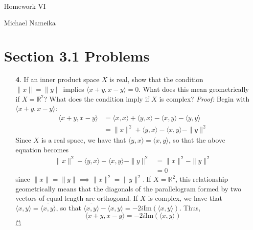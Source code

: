 \documentclass{article}
\begin{document}
\begin{center}
    {\Huge Homework VI}
    \vspace{0.5cm}

    {\Large Michael Nameika}
\end{center}

\section*{Section 3.1 Problems}
\begin{itemize}
    \item[\textbf{4}.] If an inner product space $X$ is real, show that the condition $\|x\| = \|y\|$ implies $\langle x + y, x - y \rangle = 0$. What does this mean geometrically if $X = \mathbb{R}^2$? What does the condition imply if $X$ is complex?
    \newline\newline
    \textit{Proof:} Begin with $\langle x + y, x - y \rangle$:
    \begin{align*}
        \langle x + y, x - y \rangle &= \langle x, x \rangle + \langle y, x \rangle - \langle x,y \rangle - \langle y,y \rangle\\
        &= \|x\|^2 + \langle y, x\rangle - \langle x,y \rangle - \|y\|^2
    \end{align*}
    Since $X$ is a real space, we have that $\langle y,x \rangle = \langle x, y\rangle$, so that the above equation becomes
    \begin{align*}
        \|x\|^2 + \langle y,x \rangle - \langle x, y \rangle - \|y\|^2 &= \|x\|^2 - \|y\|^2 \\
        &= 0 
    \end{align*}
    since $\|x\| = \|y\| \implies \|x\|^2 = \|y\|^2$. If $X = \mathbb{R}^2$, this relationship geometrically means that the diagonals of the parallelogram formed by two vectors of equal length are orthogonal.
    \newline\newline
    If $X$ is complex, we have that $\langle x, y\rangle = \overline{\langle x, y \rangle}$, so that $\overline{\langle x,y \rangle} - \langle x,y\rangle = -2i\text{Im}(\langle x, y\rangle)$. Thus,
    \[\langle x + y, x - y\rangle = -2i\text{Im}(\langle x, y\rangle)\]
    \hfill $\mathghost$
    
\end{itemize}
\end{document}
